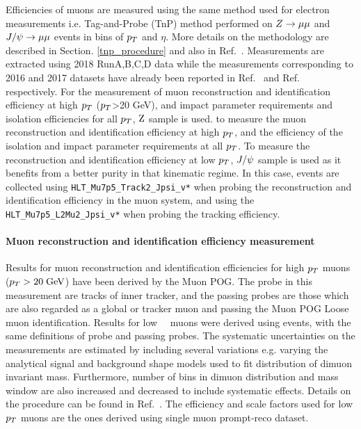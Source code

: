 Efficiencies of muons are measured using the same method used for electron measurements i.e. Tag-and-Probe (TnP) method performed on
$Z \rightarrow {\mu}{\mu}$ and $ J/\psi\rightarrow\mu\mu$ events in bins of $p_T$ and $\eta$. More
details on the methodology are described in Section. \ref{tnp_procedure} and also in Ref.~\cite{CMS_AN_2015-277}. Measurements are extracted using 2018 RunA,B,C,D data while the measurements corresponding to 2016 and 2017 datasets have already been reported in Ref.~\cite{CMS_AN_2016-442} and Ref.~\cite{CMS_AN_2017-342} respectively.
%
For the measurement of muon reconstruction and identification efficiency at high $p_T$ ($p_T$>20 GeV), and impact parameter requirements and isolation efficiencies for all $p_T$, $\mathrm{Z}$ sample is used.  to measure the muon reconstruction and identification efficiency at high $p_T$,
and the efficiency of the isolation and impact parameter requirements at all $p_T$.
%
To measure the reconstruction and identification efficiency at low $p_T$, $J/\psi$ sample is used as it benefits from a better purity in that kinematic regime. In this case,
events are collected using \verb=HLT_Mu7p5_Track2_Jpsi_v*= when probing the
reconstruction and identification efficiency in the muon system, and using the
 \verb=HLT_Mu7p5_L2Mu2_Jpsi_v*= when probing the tracking efficiency.

\paragraph*{Muon reconstruction and identification efficiency measurement}

Results for muon reconstruction and identification efficiencies for high $p_T$ muons ($p_T>20\hbox{$\;\hbox{\rm GeV}$}$) have been derived by the Muon POG.
The probe in this measurement are tracks of inner tracker, and
the passing probes are those which are also regarded as a global or tracker muon 
and passing the Muon POG Loose muon identification.
%
Results for low~\pt~ muons were derived using \Jpsi events, with the same definitions
of probe and passing probes. The systematic uncertainties on the measurements are estimated by including several variations e.g. varying the analytical signal and background shape models used to fit distribution of dimuon invariant mass. Furthermore, number of bins in dimuon distribution and mass window are also increased and decreased to include systematic effects. Details on the procedure can be found in Ref.~\cite{AN-15-277}. The efficiency and scale 
factors used for low $p_T$ muons are the ones derived using single muon prompt-reco dataset.

